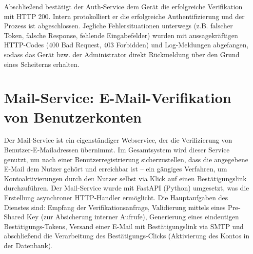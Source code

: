 Abschließend bestätigt der Auth-Service dem Gerät die erfolgreiche Verifikation mit HTTP 200. Intern protokolliert er die erfolgreiche Authentifizierung und der Prozess ist abgeschlossen. Jegliche Fehlersituationen unterwegs (z.B. falscher Token, falsche Response, fehlende Eingabefelder) wurden mit aussagekräftigen HTTP-Codes (400 Bad Request, 403 Forbidden) und Log-Meldungen abgefangen, sodass das Gerät bzw. der Administrator direkt Rückmeldung über den Grund eines Scheiterns erhalten.


\section{Mail-Service: E-Mail-Verifikation von Benutzerkonten}
Der Mail-Service ist ein eigenständiger Webservice, der die Verifizierung von Benutzer-E-Mailadressen übernimmt. Im Gesamtsystem wird dieser Service genutzt, um nach einer Benutzerregistrierung sicherzustellen, dass die angegebene E-Mail dem Nutzer gehört und erreichbar ist – ein gängiges Verfahren, um Kontoaktivierungen durch den Nutzer selbst via Klick auf einen Bestätigungslink durchzuführen. Der Mail-Service wurde mit FastAPI (Python) umgesetzt, was die Erstellung asynchroner HTTP-Handler ermöglicht. Die Hauptaufgaben des Dienstes sind: Empfang der Verifikationsanfrage, Validierung mittels eines Pre-Shared Key (zur Absicherung interner Aufrufe), Generierung eines eindeutigen Bestätigungs-Tokens, Versand einer E-Mail mit Bestätigungslink via SMTP und abschließend die Verarbeitung des Bestätigungs-Clicks (Aktivierung des Kontos in der Datenbank).
